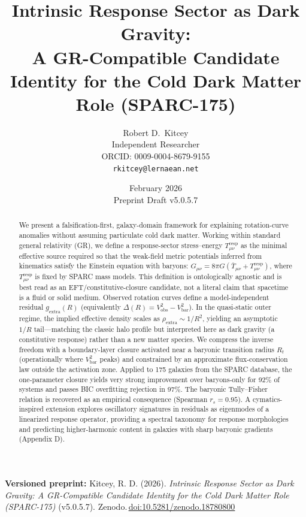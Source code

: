 \documentclass[11pt]{article}
\title{Intrinsic Response Sector as Dark Gravity:\\
\large A GR-Compatible Candidate Identity for the Cold Dark Matter Role (SPARC-175)}
\author{Robert D.\ Kitcey\\
\normalsize Independent Researcher\\
\normalsize ORCID: 0009-0004-8679-9155\\
\normalsize \texttt{rkitcey@lernaean.net}}
\date{February 2026\\Preprint Draft v5.0.5.7}
\begin{document}
\maketitle

\noindent\textbf{Versioned preprint:} Kitcey, R. D. (2026). \emph{Intrinsic Response Sector as Dark Gravity: A GR-Compatible Candidate Identity for the Cold Dark Matter Role (SPARC-175)} (v5.0.5.7). Zenodo.\,\href{https://doi.org/10.5281/zenodo.18780800}{doi:10.5281/zenodo.18780800}

\begin{abstract}
We present a falsification-first, galaxy-domain framework for explaining rotation-curve anomalies without assuming particulate cold dark matter. Working within standard general relativity (GR), we define a response-sector stress--energy \(T_{\mu\nu}^{\mathrm{resp}}\) as the minimal effective source required so that the weak-field metric potentials inferred from kinematics satisfy the Einstein equation with baryons: \(G_{\mu\nu} = 8\pi G(\overline{T}_{\mu\nu} + T_{\mu\nu}^{\mathrm{resp}})\), where \(T_{\mu\nu}^{\mathrm{resp}}\) is fixed by SPARC mass models. This definition is ontologically agnostic and is best read as an EFT/constitutive-closure candidate, not a literal claim that spacetime is a fluid or solid medium. Observed rotation curves define a model-independent residual \(g_{\mathrm{extra}}(R)\) (equivalently \(\Delta(R) = V_{\mathrm{obs}}^{2} - V_{\mathrm{bar}}^{2}\)). In the quasi-static outer regime, the implied effective density scales as \(\rho_{\mathrm{extra}} \sim 1/R^{2}\), yielding an asymptotic \(1/R\) tail---matching the classic halo profile but interpreted here as dark gravity (a constitutive response) rather than a new matter species. We compress the inverse freedom with a boundary-layer closure activated near a baryonic transition radius \(R_{t}\) (operationally where \(V_{\mathrm{bar}}^{2}\) peaks) and constrained by an approximate flux-conservation law outside the activation zone. Applied to 175 galaxies from the SPARC database, the one-parameter closure yields very strong improvement over baryons-only for 92\% of systems and passes BIC overfitting rejection in 97\%. The baryonic Tully--Fisher relation is recovered as an empirical consequence (Spearman \(r_{s} = 0.95\)). \citep{Rossing1982Chladni, Tuan2014Nodal, BenderOrszag1999} A cymatics-inspired extension explores oscillatory signatures in residuals as eigenmodes of a linearized response operator, providing a spectral taxonomy for response morphologies and predicting higher-harmonic content in galaxies with sharp baryonic gradients (Appendix D).
\end{abstract}
\end{document}
